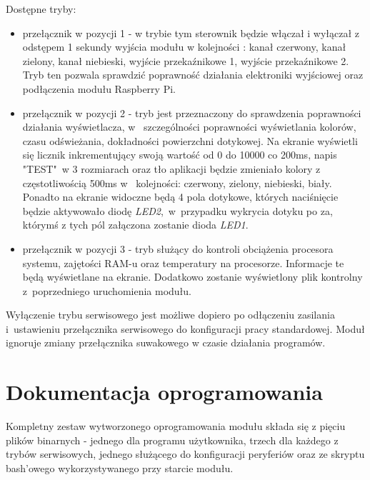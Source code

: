 \documentclass[12pt, eng, twoside, openany, final]{mgr}
\begin{document}
            Dostępne tryby:
            \begin{itemize}
                \item przełącznik w pozycji 1 - w trybie tym sterownik będzie włączał i wyłączał z odstępem 1 sekundy wyjścia modułu w kolejności : kanał czerwony, kanał zielony, kanał niebieski, wyjście przekaźnikowe 1, wyjście przekaźnikowe 2. Tryb ten pozwala sprawdzić poprawność działania elektroniki wyjściowej oraz podłączenia modułu Raspberry Pi.
                
                \item przełącznik w pozycji 2 - tryb jest przeznaczony do sprawdzenia poprawności działania wyświetlacza, w~ szczególności poprawności wyświetlania kolorów, czasu odświeżania, dokładności powierzchni dotykowej.
                Na ekranie wyświetli się licznik inkrementujący swoją wartość od 0 do 10000 co 200ms, napis "TEST"~w 3 rozmiarach oraz tło aplikacji będzie zmieniało kolory z częstotliwością 500ms w~ kolejności: czerwony, zielony, niebieski, biały. Ponadto na ekranie widoczne będą 4 pola dotykowe, których naciśnięcie będzie aktywowało diodę \emph{LED2},~w~przypadku wykrycia dotyku po za, którymś z tych pól załączona zostanie dioda \emph{LED1}. 
                
                \item przełącznik w pozycji 3 - tryb służący do kontroli obciążenia procesora systemu, zajętości RAM-u oraz temperatury na procesorze. Informacje te będą wyświetlane na ekranie. Dodatkowo zostanie wyświetlony plik kontrolny z~poprzedniego uruchomienia modułu.
            \end{itemize}
            
\noindent            Wyłączenie trybu serwisowego jest możliwe dopiero po odłączeniu zasilania i~ustawieniu przełącznika serwisowego do konfiguracji pracy standardowej.
            Moduł ignoruje zmiany przełącznika suwakowego w czasie działania programów.
            
            \newpage
            
            \section{Dokumentacja oprogramowania}
            Kompletny zestaw wytworzonego oprogramowania modułu składa się z pięciu plików binarnych - jednego dla programu użytkownika, trzech dla każdego z trybów serwisowych, jednego służącego do konfiguracji peryferiów oraz ze skryptu bash'owego wykorzystywanego przy starcie modułu.
            
\end{document}
